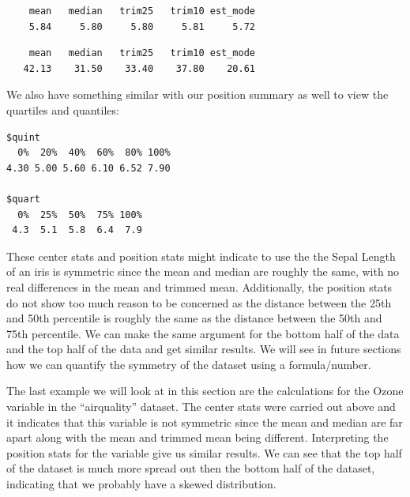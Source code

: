 \documentclass[
  letterpaper,
  DIV=11,
  numbers=noendperiod]{scrreprt}
\newenvironment{Shaded}{\begin{snugshade}}{\end{snugshade}}
\newcommand{\FunctionTok}[1]{\textcolor[rgb]{0.28,0.35,0.67}{#1}}
\newcommand{\NormalTok}[1]{\textcolor[rgb]{0.00,0.23,0.31}{#1}}
\newcommand{\SpecialCharTok}[1]{\textcolor[rgb]{0.37,0.37,0.37}{#1}}
\begin{document}
\begin{verbatim}
    mean   median   trim25   trim10 est_mode 
    5.84     5.80     5.80     5.81     5.72 
\end{verbatim}

\begin{Shaded}
\end{Shaded}

\begin{verbatim}
    mean   median   trim25   trim10 est_mode 
   42.13    31.50    33.40    37.80    20.61 
\end{verbatim}

We also have something similar with our position summary as well to view
the quartiles and quantiles:

\begin{Shaded}
\end{Shaded}

\begin{verbatim}
$quint
  0%  20%  40%  60%  80% 100% 
4.30 5.00 5.60 6.10 6.52 7.90 

$quart
  0%  25%  50%  75% 100% 
 4.3  5.1  5.8  6.4  7.9 
\end{verbatim}

These center stats and position stats might indicate to use the the
Sepal Length of an iris is symmetric since the mean and median are
roughly the same, with no real differences in the mean and trimmed mean.
Additionally, the position stats do not show too much reason to be
concerned as the distance between the 25th and 50th percentile is
roughly the same as the distance between the 50th and 75th percentile.
We can make the same argument for the bottom half of the data and the
top half of the data and get similar results. We will see in future
sections how we can quantify the symmetry of the dataset using a
formula/number.

The last example we will look at in this section are the calculations
for the Ozone variable in the ``airquality'' dataset. The center stats
were carried out above and it indicates that this variable is not
symmetric since the mean and median are far apart along with the mean
and trimmed mean being different. Interpreting the position stats for
the variable give us similar results. We can see that the top half of
the dataset is much more spread out then the bottom half of the dataset,
indicating that we probably have a skewed distribution.
\end{document}
